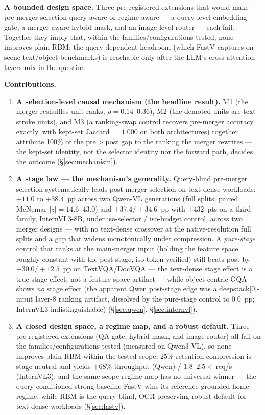 \documentclass[sigconf,review,anonymous]{acmart}
\begin{document}
\textbf{A bounded design space.} Three pre-registered extensions that would make
pre-merger selection query-aware or regime-aware --- a query-level
embedding gate, a merger-aware hybrid mask, and an image-level router --- each fail. Together they imply that, within
the families/configurations tested, none improves plain RBM; the
query-dependent headroom (which FastV
captures on scene-text/object benchmarks) is reachable only after the LLM's
cross-attention layers mix in the question.

\textbf{Contributions.}
\begin{enumerate}
  \item \textbf{A selection-level causal mechanism (the headline result).}
    M1 (the merger reshuffles unit ranks, $\rho = 0.14$--$0.36$), M2 (the
    demoted units are text-stroke units), and M3 (a ranking-swap control
    recovers pre-merger accuracy exactly, with kept-set Jaccard $= 1.000$ on
    both architectures) together attribute 100\% of the pre$>$post gap to the
    ranking the merger rewrites --- the kept-set identity, not the selector
    identity nor the forward path, decides the outcome
    (\S\ref{sec:mechanism}).
  \item \textbf{A stage law --- the mechanism's generality.} Query-blind
    pre-merger selection systematically leads post-merger selection on
    text-dense workloads: $+11.0$ to $+38.4$~pp across two Qwen-VL generations
    (full splits; paired McNemar $|z| = 14.6$--$43.0$) and $+37.4 / +34.6$~pp
    with $+432$~pts on a third family, InternVL3-8B, under iso-selector /
    iso-budget control, across two merger designs --- with no text-dense
    crossover at the native-resolution full splits and
    a gap that widens monotonically under compression. A \emph{pure-stage}
    control that ranks at the main-merger input (holding the feature space
    roughly constant with the post stage, iso-token verified) still beats
    post by $+30.0 / +12.5$~pp on TextVQA/DocVQA --- the text-dense stage
    effect is a true stage effect, not a feature-space artifact --- while
    object-centric GQA shows \emph{no} stage effect (the apparent Qwen
    post-stage edge was a deepstack[0]-input layer-8 ranking artifact,
    dissolved by the pure-stage control to $0.0$~pp; InternVL3
    indistinguishable) (\S\ref{sec:qwen}, \S\ref{sec:internvl}).
  \item \textbf{A closed design space, a regime map, and a robust default.}
    Three pre-registered extensions (QA-gate, hybrid mask, and image router)
    all fail on the families/configurations tested (measured on Qwen3-VL), so
    none improves plain RBM within the tested scope;
    25\%-retention compression is stage-neutral and yields $+68\%$ throughput
    (Qwen) / $1.8$--$2.5\times$ req/s (InternVL3); and the same-scope regime
    map has no universal winner --- the query-conditioned strong baseline
    FastV wins its reference-grounded home regime, while RBM is the
    query-blind, OCR-preserving robust default for text-dense workloads
    (\S\ref{sec:fastv}).
\end{enumerate}
\end{document}
